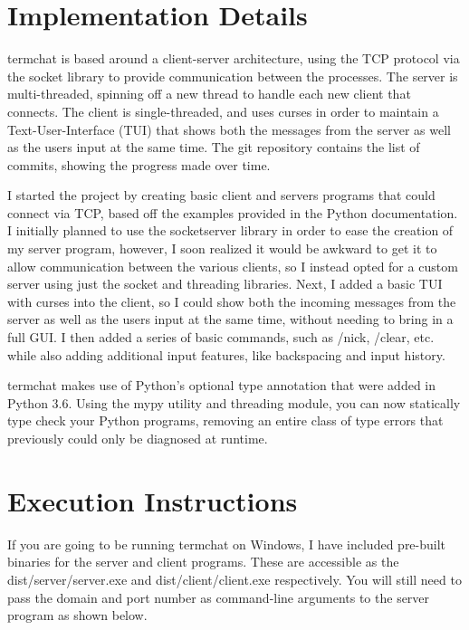 \documentclass{article}
\begin{document}
    \section{Implementation Details}
    termchat is based around a client-server architecture, using the TCP
    protocol via the socket library to provide communication between the
    processes. The server is multi-threaded, spinning off a new thread to handle
    each new client that connects. The client is single-threaded, and uses
    curses in order to maintain a Text-User-Interface (TUI) that shows both the
    messages from the server as well as the users input at the same time. The
    git repository contains the list of commits, showing the progress made over
    time.

    I started the project by creating basic client and servers programs that
    could connect via TCP, based off the examples provided in the Python
    documentation. I initially planned to use the socketserver library in order
    to ease the creation of my server program, however, I soon realized it would
    be awkward to get it to allow communication between the various clients, so
    I instead opted for a custom server using just the socket and threading
    libraries. Next, I added a basic TUI with curses into the client, so I could
    show both the incoming messages from the server as well as the users input
    at the same time, without needing to bring in a full GUI. I then added a
    series of basic commands, such as /nick, /clear, etc. while also adding
    additional input features, like backspacing and input history.

    termchat makes use of Python's optional type annotation that were added in
    Python 3.6. Using the mypy utility and threading module, you can now
    statically type check your Python programs, removing an entire class of type
    errors that previously could only be diagnosed at runtime.

    \section{Execution Instructions} 
    If you are going to be running termchat on Windows, I have included
    pre-built binaries for the server and client programs. These are accessible
    as the dist/server/server.exe and dist/client/client.exe respectively. You
    will still need to pass the domain and port number as command-line arguments
    to the server program as shown below.
\end{document}
